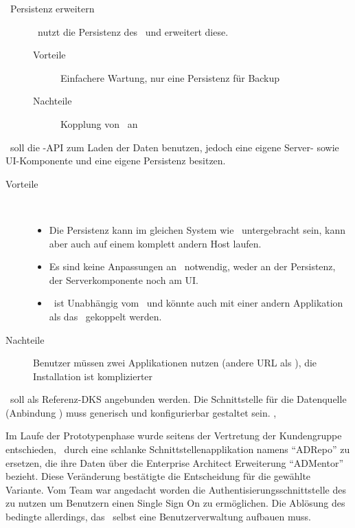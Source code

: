 {{\begin{description}
						\item[\cdar\ Persistenz erweitern]
						\eeppi\ nutzt die Persistenz des \cdar\ und erweitert diese.
						\begin{description}
							\item[Vorteile] Einfachere Wartung, nur eine Persistenz für Backup
							\item[Nachteile] Kopplung von \eeppi\ an \cdar
						\end{description}
					\end{description}
				}
				{
					\eeppi\ soll die \cdar-API zum Laden der Daten benutzen, jedoch eine eigene Server- sowie UI-Komponente und eine eigene Persistenz besitzen. 
					\begin{description}
						\item[Vorteile] \
							\begin{itemize}
								\item Die Persistenz kann im gleichen System wie \cdar\ untergebracht sein, kann aber auch auf einem komplett andern Host laufen.
								\item Es sind keine Anpassungen an \cdar\ notwendig, weder an der Persistenz, der Serverkomponente noch am UI.
								\item \eeppi\ ist Unabhängig vom \cdar\ und könnte auch mit einer andern Applikation als das \cdar\ gekoppelt werden.
							\end{itemize}
						\item[Nachteile] Benutzer müssen zwei Applikationen nutzen (andere URL als \cdar), die Installation ist komplizierter
					\end{description}
				}
				{\cdar\ soll als Referenz-DKS angebunden werden.}
				{Die Schnittstelle für die Datenquelle (Anbindung \cdar) muss generisch und konfigurierbar gestaltet sein.}
				{
					, 
				}
			}
			
			
			Im Laufe der Prototypenphase wurde seitens der Vertretung der Kundengruppe entschieden, 
			\cdar\ durch eine schlanke Schnittstellenapplikation namens "`ADRepo"' zu ersetzen, 
			die ihre Daten über die Enterprise Architect Erweiterung "`ADMentor"' bezieht. 
			Diese Veränderung bestätigte die Entscheidung für die gewählte Variante.
			Vom Team war angedacht worden die Authentisierungsschnittstelle des \cdar zu nutzen um Benutzern einen Single Sign On zu ermöglichen.
			Die Ablösung des \cdar bedingte allerdings, das \eeppi\ selbst eine Benutzerverwaltung aufbauen muss.
		
